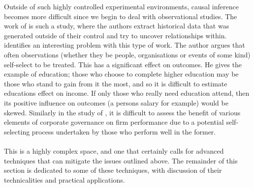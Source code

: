 {{Outside of such highly controlled experimental environments, causal inference becomes more difficult since we begin to deal with observational studies. The work of \cite{moldovan2015learning} is such a study, where the authors extract historical data that was generated outside of their control and try to uncover relationships within. \cite{esarey2015causal} identifies an interesting problem with this type of work. The author argues that often observations (whether they be people, organisations or events of some kind) self-select to be treated. This has a significant effect on outcomes. He gives the example of education; those who choose to complete higher education may be those who stand to gain from it the most, and so it is difficult to estimate educations effect on income. If only those who really need education attend, then its positive influence on outcomes (a persons salary for example) would be skewed. Similarly in the study of \cite{moldovan2015learning}, it is difficult to assess the benefit of various elements of corporate governance on firm performance due to a potential self-selecting process undertaken by those who perform well in the former. \\\\
This is a highly complex space, and one that certainly calls for advanced techniques that can mitigate the issues outlined above. The remainder of this section is dedicated to some of these techniques, with discussion of their technicalities and practical applications.  }
}
